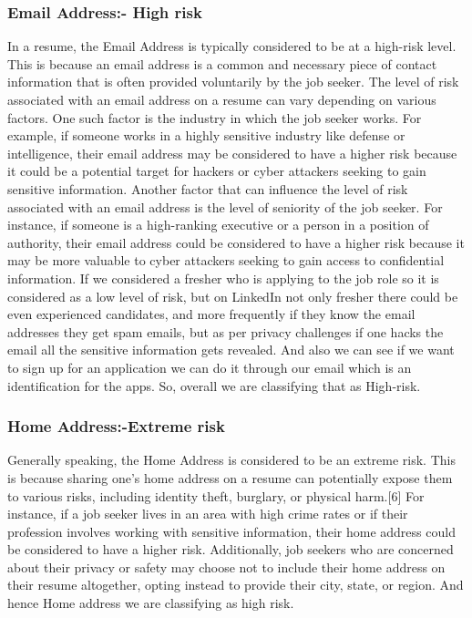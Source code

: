 \documentclass{article}
\begin{document}
\subsubsection{Email Address:- High risk}
In a resume, the Email Address is typically considered to be at a high-risk level. This is because an email address is a common and necessary piece of contact information that is often provided voluntarily by the job seeker.
The level of risk associated with an email address on a resume can vary depending on various factors. One such factor is the industry in which the job seeker works. For example, if someone works in a highly sensitive industry like defense or intelligence, their email address may be considered to have a higher risk because it could be a potential target for hackers or cyber attackers seeking to gain sensitive information.
Another factor that can influence the level of risk associated with an email address is the level of seniority of the job seeker. For instance, if someone is a high-ranking executive or a person in a position of authority, their email address could be considered to have a higher risk because it may be more valuable to cyber attackers seeking to gain access to confidential information.
If we considered a fresher who is applying to the job role so it is considered as a low level of risk, but on LinkedIn not only fresher there could be even experienced candidates, and more frequently if they know the email addresses they get spam emails, but as per privacy challenges if one hacks the email all the sensitive information gets revealed. And also we can see if we want to sign up for an application we can do it through our email which is an identification for the apps. So, overall we are classifying that as High-risk.

\subsubsection{Home Address:-Extreme risk}
Generally speaking, the Home Address is considered to be an extreme risk. This is because sharing one's home address on a resume can potentially expose them to various risks, including identity theft, burglary, or physical harm.[6]
For instance, if a job seeker lives in an area with high crime rates or if their profession involves working with sensitive information, their home address could be considered to have a higher risk. Additionally, job seekers who are concerned about their privacy or safety may choose not to include their home address on their resume altogether, opting instead to provide their city, state, or region. And hence Home address we are classifying as high risk.
\end{document}
